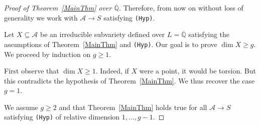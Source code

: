 \documentclass[12pt,oneside]{amsart}
\numberwithin{maincounter}{section}
\numberwithin{equation}{section}
\def\CC{\mathbb{C}}
\def\QQ{\mathbb{Q}}
\newcommand{\cal}{\mathcal}
\newcommand{\cA}{\cal{A}}
\newcommand{\IC}{{\CC}}
\newcommand{\IQbar}{{\overline{\QQ}}}
\newcommand{\philipp}[1]{{\color{blue} Philipp: #1}}
\begin{document}
\begin{proof}[Proof of Theorem~\ref{MainThm} over $\IQbar$]
Therefore, from now on without loss of generality we work with $\cA
\rightarrow S$ satisfying {\tt (Hyp)}. %

Let $X \subseteq \cA$ be an irreducible subvariety defined over
$L=\IQbar$ satisfying the assumptions of Theorem~\ref{MainThm} and {\tt (Hyp)}. Our goal is to prove $\dim X\ge g$. We proceed by
induction on $g\ge 1$. 

First observe that  $\dim X \ge 1$. Indeed, if $X$ were a point, it
would be torsion. But this contradicts the hypothesis of
Theorem~\ref{MainThm}.
We thus recover the case $g=1$. 

We assume $g\ge 2$ and
that Theorem~\ref{MainThm} holds true for all $\cA \rightarrow
S$ satisfying {\tt (Hyp)} of relative dimension
$1,\ldots,g-1$. %



\end{proof}
\end{document}

